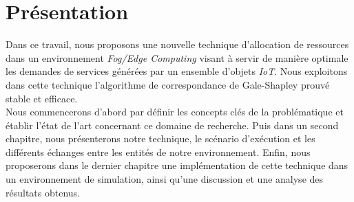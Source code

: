 \section{Présentation}
\par Dans ce travail, nous proposons une nouvelle technique d'allocation de ressources dans un environnement \emph{Fog/Edge Computing} visant à servir de manière optimale les demandes de services générées par un ensemble d'objets \emph{IoT}. Nous exploitons dans cette technique l'algorithme de correspondance de Gale-Shapley prouvé stable et efficace.\\
Nous commencerons d'abord par définir les concepts clés de la problématique et établir l'état de l'art concernant ce domaine de recherche. Puis dans un second chapitre, nous présenterons notre technique, le scénario d'exécution et les différents échanges entre les entités de notre environnement. Enfin, nous proposerons dans le dernier chapitre une implémentation de cette technique dans un environnement de simulation, ainsi qu'une discussion et une analyse des résultats obtenus.